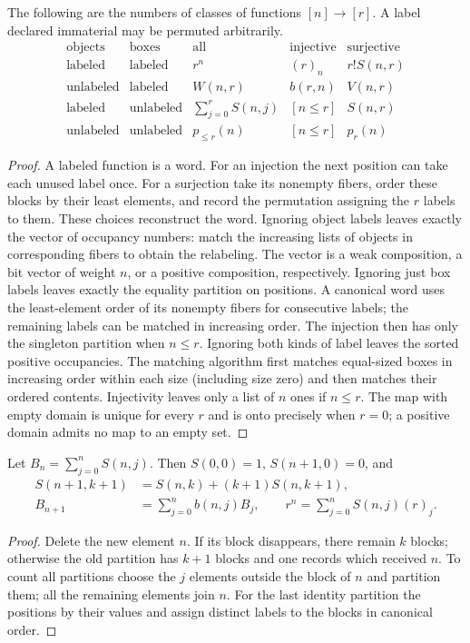 \begin{theorem}\label{result06}
The following are the numbers of classes of functions $[n]\to[r]$.
A label declared immaterial may be permuted arbitrarily.
\[
\begin{array}{ll|ccc}
\text{objects}&\text{boxes}&\text{all}&\text{injective}&\text{surjective}\\ \hline
\text{labeled}&\text{labeled}&r^n&(r)_n&r!S(n,r)\\
\text{unlabeled}&\text{labeled}&W(n,r)&b(r,n)&V(n,r)\\
\text{labeled}&\text{unlabeled}&\sum_{j=0}^r S(n,j)&[n\le r]&S(n,r)\\
\text{unlabeled}&\text{unlabeled}&p_{\le r}(n)&[n\le r]&p_r(n)
\end{array}
\]
\end{theorem}
\begin{proof}
A labeled function is a word. For an injection the next position can take
each unused label once. For a surjection take its nonempty fibers, order
these blocks by their least elements, and record the permutation assigning
the $r$ labels to them. These choices reconstruct the word.
Ignoring object labels leaves exactly the vector of occupancy numbers:
match the increasing lists of objects in corresponding fibers to obtain
the relabeling. The vector is a weak composition, a bit vector of weight
$n$, or a positive composition, respectively. Ignoring just box labels
leaves exactly the equality partition on positions. A canonical word uses
the least-element order of its nonempty fibers for consecutive labels;
the remaining labels can be matched in increasing order. The injection
then has only the singleton partition when $n\le r$.
Ignoring both kinds of label leaves the sorted positive occupancies.
The matching algorithm first matches equal-sized boxes in increasing order
within each size (including size zero) and then matches their ordered
contents. Injectivity leaves only a list of $n$ ones if $n\le r$.
The map with empty domain is unique for every $r$ and is onto precisely
when $r=0$; a positive domain admits no map to an empty set.
\end{proof}

\begin{corollary}\label{result07}
Let $B_n=\sum_{j=0}^n S(n,j)$. Then $S(0,0)=1$, $S(n+1,0)=0$, and
\[
\begin{split}
 S(n+1,k+1)&=S(n,k)+(k+1)S(n,k+1),\\
 B_{n+1}&=\sum_{j=0}^n b(n,j)B_j,\qquad
 r^n=\sum_{j=0}^n S(n,j)(r)_j .
\end{split}
\]
\end{corollary}
\begin{proof}
Delete the new element $n$. If its block disappears, there remain $k$
blocks; otherwise the old partition has $k+1$ blocks and one records
which received $n$. To count all partitions choose the $j$ elements outside
the block of $n$ and partition them; all the remaining elements join $n$.
For the last identity partition the positions by their values and assign
distinct labels to the blocks in canonical order.
\end{proof}


